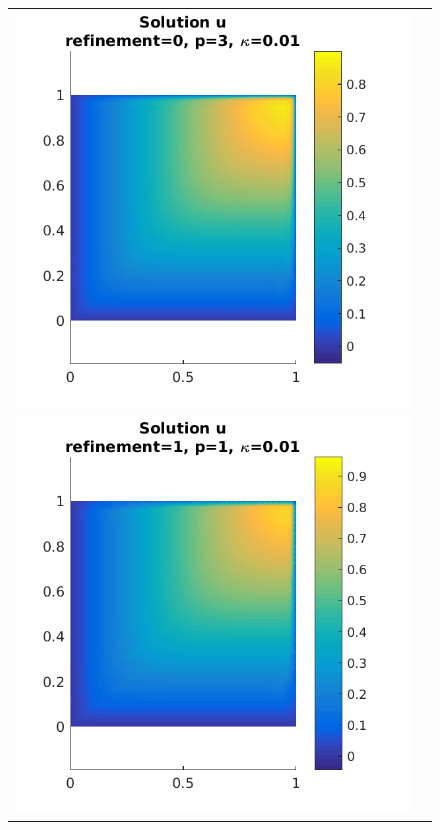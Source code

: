 \documentclass{article}
\begin{document}
\begin{figure}[!ht]
\begin{tabular}{c c}
\includegraphics[scale=0.7]{umu_213.png} \\
\includegraphics[scale=0.7]{umu_123.png} & 

\end{tabular}
\end{figure}
\end{document}
